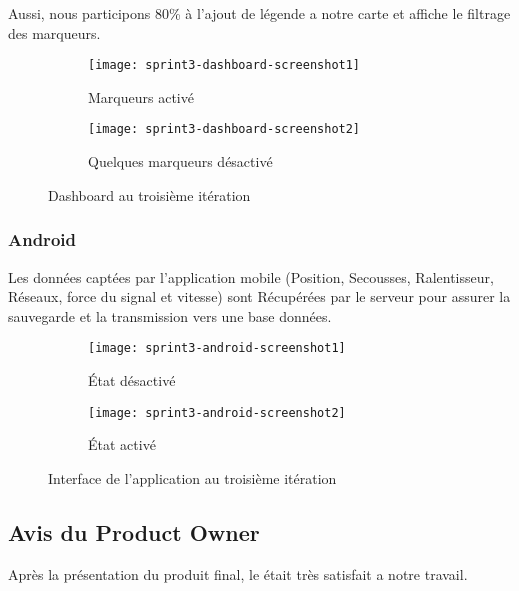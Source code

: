 Aussi, nous participons 80\% à l'ajout de légende a notre carte et affiche le
filtrage des marqueurs.

\begin{figure}[H]
\centering
    \begin{subfigure}{.8\textwidth}
    \centering
  \centering
  \texttt{[image: sprint3-dashboard-screenshot1]}
  \caption{Marqueurs activé}
\label{fig:sprint3-dashboard-screenshot1}
\end{subfigure}
\begin{subfigure}{.8\textwidth}
    \centering
  \centering
  \texttt{[image: sprint3-dashboard-screenshot2]}
  \caption{Quelques marqueurs désactivé}
\label{sprint3-dashboard-screenshot2}
\end{subfigure}
\caption{Dashboard  au troisième itération}
\end{figure}

\subsubsection{Android}

Les données captées par l'application mobile (Position, Secousses,
Ralentisseur, Réseaux, force du signal et vitesse) sont Récupérées par le
serveur pour assurer la sauvegarde et la transmission vers une base données.

\begin{figure}[H]
\centering
    \begin{subfigure}{.4\textwidth}
    \centering
  \centering
  \texttt{[image: sprint3-android-screenshot1]}
  \caption{État désactivé}
\label{fig:sprint3-android-screenshot1}
\end{subfigure}
\begin{subfigure}{.4\textwidth}
    \centering
  \centering
  \texttt{[image: sprint3-android-screenshot2]}
  \caption{État activé}
\label{fig:sprint3-android-screenshot2}
\end{subfigure}
\caption{Interface de l'application au troisième itération}
\end{figure}

\subsection{Avis du Product Owner}

Après la présentation du produit final, le  était très satisfait
a notre travail.

